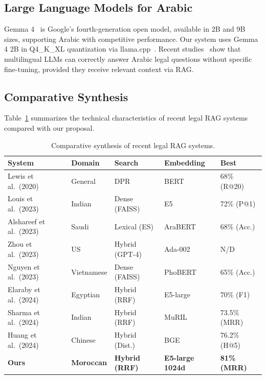\subsection{Large Language Models for Arabic}

Gemma 4~\cite{google2025gemma4} is Google's fourth-generation open model,
available in 2B and 9B sizes, supporting Arabic with competitive performance.
Our system uses Gemma 4 2B in Q4\_K\_XL quantization via
llama.cpp~\cite{gerganov2023llamacpp}. Recent studies~\cite{hendy2023llm} show
that multilingual LLMs can correctly answer Arabic legal questions without
specific fine-tuning, provided they receive relevant context via RAG.

\subsection{Comparative Synthesis}

Table~\ref{tab:related_synthesis} summarizes the technical characteristics of
recent legal RAG systems compared with our proposal.

\begin{table}[t]
\centering
\caption{Comparative synthesis of recent legal RAG systems.}
\label{tab:related_synthesis}
\small
\begin{tabular}{@{}lllll@{}}
\toprule
\textbf{System} & \textbf{Domain} & \textbf{Search} & \textbf{Embedding} & \textbf{Best} \\
\midrule
Lewis et al.\ (2020)  & General   & DPR             & BERT     & 68\% (R@20) \\
Louis et al.\ (2023)  & Indian    & Dense (FAISS)   & E5       & 72\% (P@1) \\
Alshareef et al.\ (2023) & Saudi & Lexical (ES)   & AraBERT  & 68\% (Acc.) \\
Zhou et al.\ (2023)   & US         & Hybrid (GPT-4)  & Ada-002  & N/D \\
Nguyen et al.\ (2023) & Vietnamese & Dense (FAISS) & PhoBERT  & 65\% (Acc.) \\
Elaraby et al.\ (2024) & Egyptian  & Hybrid (RRF)   & E5-large & 70\% (F1) \\
Sharma et al.\ (2024) & Indian     & Hybrid (RRF)   & MuRIL    & 73.5\% (MRR) \\
Huang et al.\ (2024)  & Chinese    & Hybrid (Dist.) & BGE      & 76.2\% (H@5) \\
\textbf{Ours}         & \textbf{Moroccan} & \textbf{Hybrid (RRF)} & \textbf{E5-large 1024d} & \textbf{81\% (MRR)} \\
\bottomrule
\end{tabular}
\end{table}
